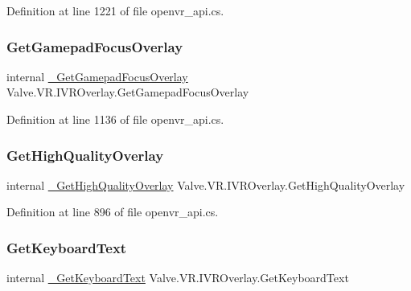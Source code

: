 Definition at line 1221 of file openvr\+\_\+api.\+cs.

\mbox{\label{struct_valve_1_1_v_r_1_1_i_v_r_overlay_afdeef7855b25f0c1784f77cb8cedc738}} 
\subsubsection{\texorpdfstring{GetGamepadFocusOverlay}{GetGamepadFocusOverlay}}
{\footnotesize\ttfamily internal \mbox{\hyperlink{struct_valve_1_1_v_r_1_1_i_v_r_overlay_a5d0bd8d9b0f09e1738bc3da860d9a0a1}{\+\_\+\+Get\+Gamepad\+Focus\+Overlay}} Valve.\+V\+R.\+I\+V\+R\+Overlay.\+Get\+Gamepad\+Focus\+Overlay}



Definition at line 1136 of file openvr\+\_\+api.\+cs.

\mbox{\label{struct_valve_1_1_v_r_1_1_i_v_r_overlay_a01398e41de654a05e29b1e0c2cc940cd}} 
\subsubsection{\texorpdfstring{GetHighQualityOverlay}{GetHighQualityOverlay}}
{\footnotesize\ttfamily internal \mbox{\hyperlink{struct_valve_1_1_v_r_1_1_i_v_r_overlay_a2e6c4ca94aa9cf9f2735457e985f1994}{\+\_\+\+Get\+High\+Quality\+Overlay}} Valve.\+V\+R.\+I\+V\+R\+Overlay.\+Get\+High\+Quality\+Overlay}



Definition at line 896 of file openvr\+\_\+api.\+cs.

\mbox{\label{struct_valve_1_1_v_r_1_1_i_v_r_overlay_af8228d50bda98e95b857a70045ad1d36}} 
\subsubsection{\texorpdfstring{GetKeyboardText}{GetKeyboardText}}
{\footnotesize\ttfamily internal \mbox{\hyperlink{struct_valve_1_1_v_r_1_1_i_v_r_overlay_a6c94397fef04c6bac6f7865bb92ed82a}{\+\_\+\+Get\+Keyboard\+Text}} Valve.\+V\+R.\+I\+V\+R\+Overlay.\+Get\+Keyboard\+Text}



